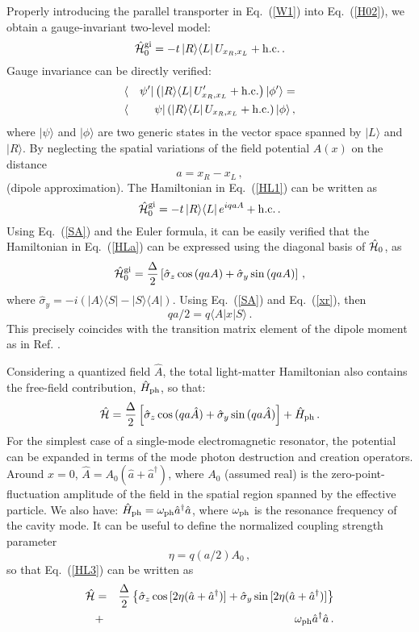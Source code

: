 \documentclass[aps,pra,reprint, superscriptaddress,amsmath,showpacs,longbibliography]{revtex4-2}
\renewcommand{\eqref}[1]{\mbox{Eq.~(\ref{#1})}}
\newcommand{\be}{\begin{equation}}
\newcommand{\ee}{\end{equation}}
\newcommand{\bea}{\begin{eqnarray}}
\newcommand{\eea}{\end{eqnarray}}
\begin{document}
Properly introducing the parallel transporter in \eqref{W1} into \eqref{H02}, we obtain a gauge-invariant two-level model:
\be\label{HL1}
\hat {\cal H}^{\rm gi}_0 = - t\, |R \rangle \langle L|\, U_{x_R, x_L} + {\rm h. c.}\, .
\ee
Gauge invariance can be directly verified: 
\bea
&\langle& \psi' | \left( |R \rangle \langle L|\, U'_{x_R, x_L} + {\rm h. c.} \right) |\phi' \rangle =  \nonumber \\
&\langle& \psi | \left( |R \rangle \langle L|\, U_{x_R, x_L} + {\rm h. c.} \right) |\phi \rangle\, ,\nonumber
\eea
where $| \psi \rangle$ and $| \phi \rangle$ are two generic states in the vector space spanned by $| L \rangle$ and $| R \rangle$.
By neglecting the spatial variations of the field potential $A(x)$ on the distance $$a = x_R - x_L\, ,$$ (dipole approximation). The Hamiltonian in \eqref{HL1} can be written as
\be\label{HLa}
\hat {\cal H}^{\rm gi}_0 = - t\, |R \rangle \langle L|\, e^{i q a A} + {\rm h. c.}\, .
\ee
Using \eqref{SA} and the Euler formula, it can be easily verified that the Hamiltonian in \eqref{HLa} can be expressed using the diagonal basis of $\hat {\cal H}_0$, as
\be\label{HL2}
\hat {\cal H}^{\rm gi}_0 =  \frac{\Delta}{2} \left[ \hat \sigma_z
 \cos{(q a  A)} + \hat \sigma_y \sin{(q a  A)}
 \right]\, ,
\ee
where $\hat \sigma_y = -i \left( | A \rangle \langle S| - |S \rangle \langle A| \right)$. Using \eqref{SA} and \eqref{xr},  {then} 
\be\label{d}
q a/2 = q \langle A | x | S \rangle\, . 
\ee
This {precisely} coincides with the transition matrix element of the dipole moment as in Ref. \cite{DiStefano2019}. 

Considering a quantized field $\hat A$, the total light-matter Hamiltonian also contains the free-field contribution, $\hat H_{\rm ph}$, so that:
\be\label{HL3}
	\hat {\cal H} =  \frac{\Delta}{2} \left[ \hat \sigma_z
	\cos{(q a \hat A)} + \hat \sigma_y \sin{(q a \hat A)}
	\right] 
	+ \hat H_{\rm ph}\, .
\ee
For the simplest case of a single-mode electromagnetic resonator,  the potential can be expanded in terms of the mode photon destruction and creation operators. Around $x=0$,  $\hat A = A_0 (\hat a + \hat a^\dag)$, where $A_0$ {(assumed real)} is the zero-point-fluctuation amplitude of the field in the spatial region spanned by the effective particle. We also have: $\hat H_{\rm ph} = \omega_{\rm ph} \hat a^\dag \hat a$, where $\omega_{\rm ph}$ is the resonance frequency of the cavity mode. It can be useful to define the normalized coupling strength parameter \cite{DiStefano2019}
\be
\eta = q (a/2) A_0\, ,
\ee
so that \eqref{HL3} can be written as
\bea
\hat {\cal H} &=&  \frac{\Delta}{2} \left\{ \hat \sigma_z
\cos{[ 2 \eta (\hat a + \hat a^\dag) ]} + \hat \sigma_y \sin{[2 \eta (\hat a + \hat a^\dag)]}
\right\}\nonumber \\
&+& \omega_{\rm ph} \hat a^\dag \hat a\, .
\label{HL33}
\eea
\end{document}
